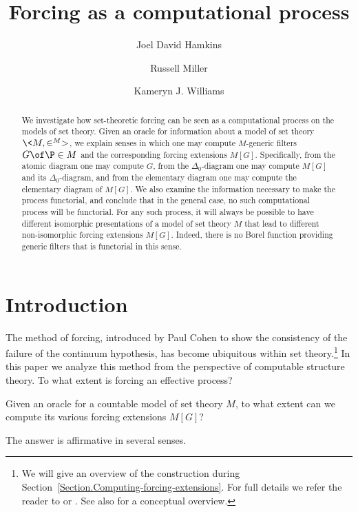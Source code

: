 \documentclass{amsart}
\title{Forcing as a computational process}
\author{Joel David Hamkins}
\author{Russell Miller}
\author{Kameryn J. Williams}
\begin{document}
\begin{abstract}
We investigate how set-theoretic forcing can be seen as a computational process on the models of set theory. Given an oracle for information about a model of set theory $\<M,\in^M>$, we explain senses in which one may compute $M$-generic filters $G\of\P\in M$ and the corresponding forcing extensions $M[G]$. Specifically, from the atomic diagram one may compute $G$, from the $\Delta_0$-diagram one may compute $M[G]$ and its $\Delta_0$-diagram, and from the elementary diagram one may compute the elementary diagram of $M[G]$.
We also examine the information necessary to make the process functorial, and conclude that in the general case, no such computational process will be functorial. For any such process, it will always be possible to have different isomorphic presentations of a model of set theory $M$ that lead to different non-isomorphic forcing extensions $M[G]$. Indeed, there is no Borel function providing generic filters that is functorial in this sense.
\end{abstract}


\maketitle


\section{Introduction}\label{Section.Introduction}

The method of forcing, introduced by Paul Cohen to show the consistency of the failure of the continuum hypothesis,
has become ubiquitous within set theory.\footnote{We will give an overview of the construction during Section~\ref{Section.Computing-forcing-extensions}. For full details we refer the reader to \cite{Shoenfield1971:UnramifiedForcing} or \cite{Kunen1980:SetTheory}. See also \cite{Chow2007:ABeginnersGuideToForcing} for a conceptual overview.}
In this paper we analyze this method from the perspective of computable structure theory. To what extent is
forcing an effective process?

\begin{mainquestion*}
Given an oracle for a countable model of set theory $M$, to what extent can we compute its various forcing extensions $M[G]$?
\end{mainquestion*}

The answer is affirmative in several senses.
\end{document}
